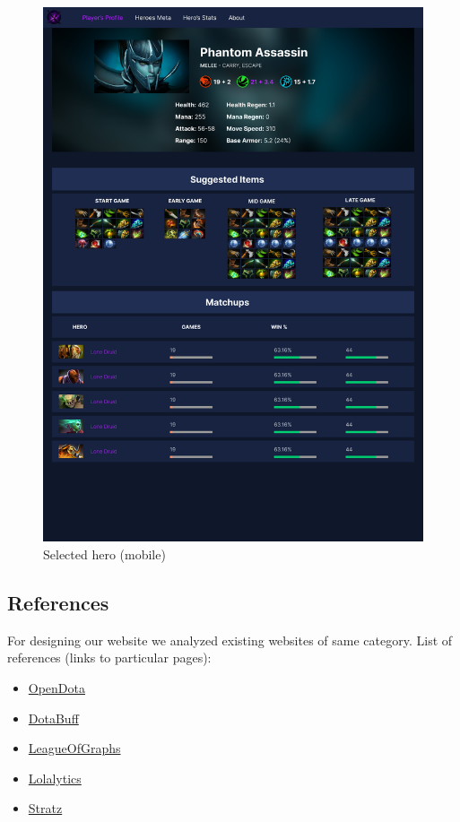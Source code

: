 \begin{figure}[ht]
\begin{minipage}[t]{0.48\textwidth}
            \includegraphics[width=\textwidth]{images/SelectedHero_m}
            \caption{Selected hero (mobile)}
        \end{minipage}
    \end{figure}



    \subsection{References}
        For designing our website we analyzed existing websites of same category.
        List of references (links to particular pages):
        \begin{itemize}
            \item \href{https://www.opendota.com/heroes/public}{OpenDota}
            \item \href{https://www.dotabuff.com/esports/players/321580662-yatoro}{DotaBuff}
            \item \href{https://www.leagueofgraphs.com/summoner/ru/L9+Capybara-ff15}{LeagueOfGraphs}
            \item \href{https://lolalytics.com/de/lol/katarina/build/}{Lolalytics}
            \item \href{https://stratz.com/players/ranks}{Stratz}
        \end{itemize}

